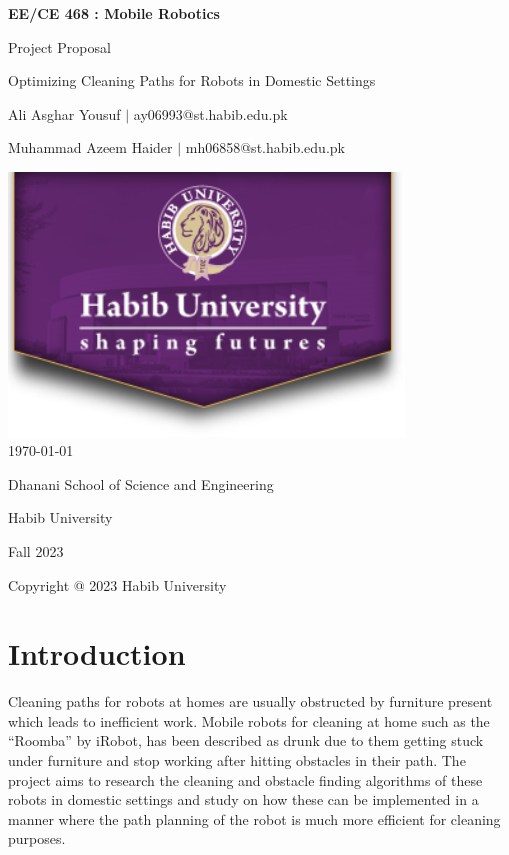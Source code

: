 \documentclass[12pt]{article}
\begin{document}
\begin{titlepage}
    \centering
    {\LARGE\textbf{EE/CE 468 : Mobile Robotics}\par}
    \vspace{0.5cm}
    {\Large Project Proposal\par}
    \vspace{0.2cm}
    {\Large Optimizing Cleaning Paths for Robots in Domestic Settings\par}
    \vspace*{\fill} %
    {\large Ali Asghar Yousuf $\mid$ ay06993@st.habib.edu.pk\par}
    {\large Muhammad Azeem Haider $\mid$ mh06858@st.habib.edu.pk\par}
    \vspace{2cm}
    \includegraphics[height=7cm]{../HU_logo}\\\bigskip
    {\large \today}\\\bigskip\bigskip
    \vspace{1cm}
    \vspace{2cm}
    {\large Dhanani School of Science and Engineering\par}
    {\large Habib University\par}
    {\large Fall 2023\par}
    \vspace*{\fill} %
    {\large Copyright @ 2023 Habib University\par}
\end{titlepage}

\thispagestyle{empty} %
\tableofcontents
\clearpage

\section{Introduction}
Cleaning paths for robots at homes are usually obstructed by furniture present
which leads to inefficient work. Mobile robots for cleaning at home such as the
``Roomba'' by iRobot, has been described as drunk due to them getting stuck
under furniture and stop working after hitting obstacles in their path. The
project aims to research the cleaning and obstacle finding algorithms of these
robots in domestic settings and study on how these can be implemented in a
manner where the path planning of the robot is much more efficient for cleaning
purposes.
\end{document}

